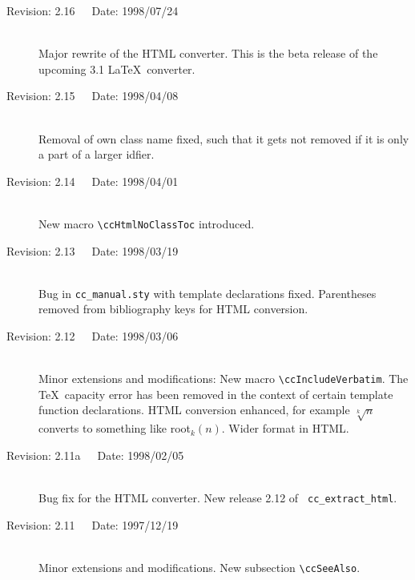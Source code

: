 \documentclass[11pt]{article}
\begin{document}
\begin{description}
    \item[Revision: 2.16~~~Date: 1998/07/24]~\\[3mm]
    Major rewrite of the HTML converter. This is the beta release of the
    upcoming 3.1 \LaTeX\ converter.

    \item[Revision: 2.15~~~Date: 1998/04/08]~\\[3mm]
    Removal of own class name fixed, such that it gets not removed
    if it is only a part of a larger idfier.

    \item[Revision: 2.14~~~Date: 1998/04/01]~\\[3mm]
    New macro \verb+\ccHtmlNoClassToc+ introduced.

    \item[Revision: 2.13~~~Date: 1998/03/19]~\\[3mm]
    Bug in {\tt cc\_manual.sty} with template declarations fixed. 
    Parentheses removed from bibliography keys for HTML conversion.

    \item[Revision: 2.12~~~Date: 1998/03/06]~\\[3mm]
    Minor extensions and modifications: New macro \verb+\ccIncludeVerbatim+.
    The \TeX\ capacity error has been removed in the context of certain
    template function declarations.  HTML conversion enhanced, for example
    $\sqrt[k]{n}$ converts to something like root$_k(n)$. Wider format in HTML.

    \item[Revision: 2.11a~~~Date: 1998/02/05]~\\[3mm]
    Bug fix for the HTML converter. New release 2.12 of {\tt
    cc\_extract\_html}.

    \item[Revision: 2.11~~~Date: 1997/12/19]~\\[3mm]
    Minor extensions and modifications. New subsection \verb+\ccSeeAlso+.


\end{description}
\end{document}
